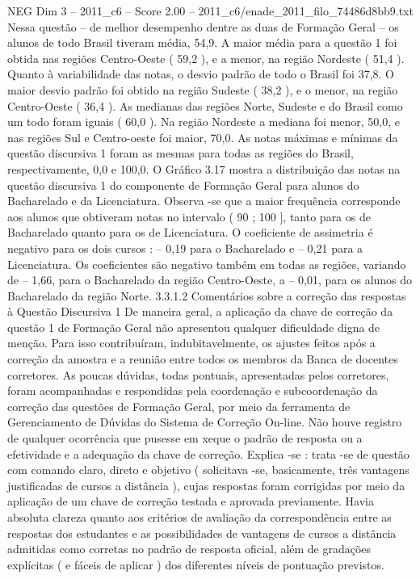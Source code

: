 \begin{textsample}{NEG Dim 3 – 2011\_c6 – Score 2.00 – 2011\_c6/enade\_2011\_filo\_74486d8bb9.txt}
Nessa questão – de melhor desempenho dentre as duas de Formação Geral – os alunos de todo Brasil tiveram média, 54,9.
A maior média para a questão 1 foi obtida nas regiões Centro-Oeste ( 59,2 ), e a menor, na região Nordeste ( 51,4 ).
Quanto à variabilidade das notas, o desvio padrão de todo o Brasil foi 37,8.
O maior desvio padrão foi obtido na região Sudeste ( 38,2 ), e o menor, na região Centro-Oeste ( 36,4 ).
As medianas das regiões Norte, Sudeste e do Brasil como um todo foram iguais ( 60,0 ).
Na região Nordeste a mediana foi menor, 50,0, e nas regiões Sul e Centro-oeste foi maior, 70,0.
As notas máximas e mínimas da questão discursiva 1 foram as mesmas para todas as regiões do Brasil, respectivamente, 0,0 e 100,0.
O Gráfico 3.17 mostra a distribuição das notas na questão discursiva 1 do componente de Formação Geral para alunos do Bacharelado e da Licenciatura.
Observa -se que a maior frequência corresponde aos alunos que obtiveram notas no intervalo ( 90 ; 100 ], tanto para os de Bacharelado quanto para os de Licenciatura.
O coeficiente de assimetria é negativo para os dois cursos : – 0,19 para o Bacharelado e – 0,21 para a Licenciatura.
Os coeficientes são negativo também em todas as regiões, variando de – 1,66, para o Bacharelado da região Centro-Oeste, a – 0,01, para os alunos do Bacharelado da região Norte. 3.3.1.2 Comentários sobre a correção das respostas à Questão Discursiva 1 De maneira geral, a aplicação da chave de correção da questão 1 de Formação Geral não apresentou qualquer dificuldade digna de menção.
Para isso contribuíram, indubitavelmente, os ajustes feitos após a correção da amostra e a reunião entre todos os membros da Banca de docentes corretores.
As poucas dúvidas, todas pontuais, apresentadas pelos corretores, foram acompanhadas e respondidas pela coordenação e subcoordenação da correção das questões de Formação Geral, por meio da ferramenta de Gerenciamento de Dúvidas do Sistema de Correção On-line.
Não houve registro de qualquer ocorrência que pusesse em xeque o padrão de resposta ou a efetividade e a adequação da chave de correção.
Explica -se : trata -se de questão com comando claro, direto e objetivo ( solicitava -se, basicamente, três vantagens justificadas de cursos a distância ), cujas respostas foram corrigidas por meio da aplicação de um chave de correção testada e aprovada previamente.
Havia absoluta clareza quanto aos critérios de avaliação da correspondência entre as respostas dos estudantes e as possibilidades de vantagens de cursos a distância admitidas como corretas no padrão de resposta oficial, além de gradações explícitas ( e fáceis de aplicar ) dos diferentes níveis de pontuação previstos.

\end{textsample}
